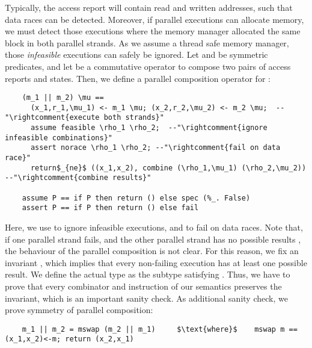 \documentclass[a4paper,UKenglish,cleveref, autoref, thm-restate]{lipics-v2021}
\begin{document}
  Typically, the access report will contain read and written addresses, such that data races can be detected.
  Moreover, if parallel executions can allocate memory, we must detect those
  executions where the memory manager allocated the same block in both parallel strands.
  As we assume a thread safe memory manager, those \emph{infeasible} executions can safely be ignored.
  Let  and  be symmetric predicates,
  and let  be a commutative operator to
  compose two pairs of access reports and states. Then, we define a parallel composition operator for :
  \begin{lstlisting}
    (m_1 || m_2) \mu ==
      (x_1,r_1,\mu_1) <- m_1 \mu; (x_2,r_2,\mu_2) <- m_2 \mu;  --"\rightcomment{execute both strands}"
      assume feasible \rho_1 \rho_2;  --"\rightcomment{ignore infeasible combinations}"
      assert norace \rho_1 \rho_2; --"\rightcomment{fail on data race}"
      return$_{ne}$ ((x_1,x_2), combine (\rho_1,\mu_1) (\rho_2,\mu_2))  --"\rightcomment{combine results}"

    assume P == if P then return () else spec (%_. False)
    assert P == if P then return () else fail
  \end{lstlisting}
  Here, we use  to ignore infeasible executions, and  to fail on data races.
  Note that, if one parallel strand fails, and the other parallel strand has no possible
  results , the behaviour of the parallel composition is not clear.
  For this reason, we fix an invariant ,
  which implies that every non-failing execution has at least one possible result.
  We define the actual type  as the subtype satisfying .
  Thus, we have to prove that every combinator and instruction of our semantics
  preserves the invariant, which is an important sanity check.
  As additional sanity check, we prove symmetry of parallel composition:
  \begin{lstlisting}
    m_1 || m_2 = mswap (m_2 || m_1)     $\text{where}$    mswap m == (x_1,x_2)<-m; return (x_2,x_1)
  \end{lstlisting}
\end{document}
